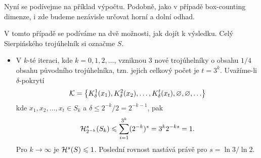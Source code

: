 Nyní se podívejme na příklad výpočtu. Podobně, jako v případě box-counting dimenze, i zde budeme nezávisle určovat horní a dolní odhad.
\begin{example}\label{ex:sierpinskeho-trojuhelnik-hd-dimenze}
    V tomto případě se podíváme na dvě možnosti, jak dojít k výsledku. Celý Sierpińského trojúhelník si označme $S$.
    \begin{itemize}
        \item V $k$-té iteraci, kde $k=0,1,2,\ldots$, vzniknou 3 nové trojúhelníky o obsahu $1/4$ obsahu původního trojúhelníka, tzn. jejich celkový počet je $t=3^k$. Uvažíme-li $\delta$-pokrytí
        \[\mathcal{K}=\set{K_\delta^1(x_1),K_\delta^2(x_2),\ldots,K_\delta^t(x_t),\emptyset,\emptyset,\ldots}\]
        kde $x_1,x_2,\ldots,x_t\in S_k$ a $\delta\leqslant 2^{-k}/2=2^{-k-1}$, pak
        \[\hausdorffdeltameasure{s}{2^{-k}}(S_k)\leqslant\sum_{i=1}^{3^k}(2^{-k})^s=3^k2^{-ks}=1.\]
        Pro $k\to\infty$ je $\hausdorffmeasure{s}(S)\leqslant 1$. Poslední rovnost nastává právě pro $s=\ln{3}/\ln{2}$.


\end{itemize}
\end{example}
